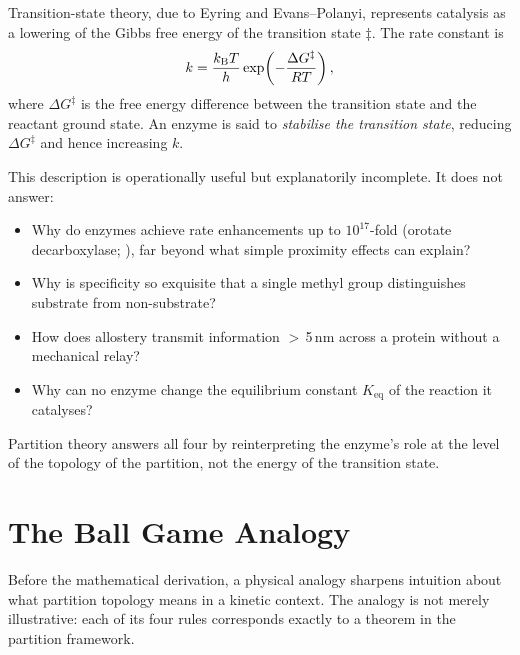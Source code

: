 Transition-state theory, due to Eyring and Evans--Polanyi, represents catalysis
as a lowering of the Gibbs free energy of the transition state $\ddagger$.
The rate constant is
\begin{equation}
  k = \frac{k_{\mathrm{B}} T}{h} \exp\!\left(-\frac{\Delta G^\ddagger}{RT}\right),
  \label{eq:eyring}
\end{equation}
where $\Delta G^\ddagger$ is the free energy difference between the transition
state and the reactant ground state. An enzyme is said to \emph{stabilise the
transition state}, reducing $\Delta G^\ddagger$ and hence increasing $k$.

This description is operationally useful but explanatorily incomplete.
It does not answer:
\begin{itemize}
  \item Why do enzymes achieve rate enhancements up to $10^{17}$-fold
        (orotate decarboxylase; \citealt{Wolfenden2001}), far beyond what
        simple proximity effects can explain?
  \item Why is specificity so exquisite that a single methyl group distinguishes
        substrate from non-substrate?
  \item How does allostery transmit information $>$\,5\,nm across a protein
        without a mechanical relay?
  \item Why can no enzyme change the equilibrium constant $K_{\mathrm{eq}}$
        of the reaction it catalyses?
\end{itemize}

Partition theory answers all four by reinterpreting the enzyme's role at
the level of the topology of the partition, not the energy of the transition
state.

\section{The Ball Game Analogy}
\label{sec:ball_game}

Before the mathematical derivation, a physical analogy sharpens intuition about
what partition topology means in a kinetic context. The analogy is not merely
illustrative: each of its four rules corresponds exactly to a theorem in the
partition framework.

